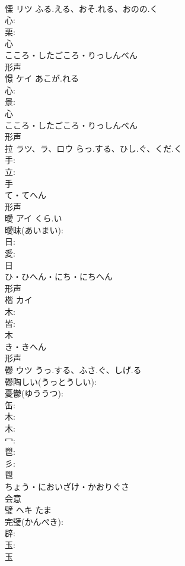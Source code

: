 \documentclass[8pt]{extreport}
\begin{document}
\begin{CJK}{UTF8}{min}
\\	慄	リツ	ふる.える、おそ.れる、おのの.く		
\\	心: 
\\	栗: 
\\	心	
\\	こころ・したごころ・りっしんべん	
\\	形声 
\\	憬	ケイ	あこが.れる		
\\	心: 
\\	景: 
\\	心	
\\	こころ・したごころ・りっしんべん	
\\	形声 
\\	拉	ラツ、ラ、ロウ	らっ.する、ひし.ぐ、くだ.く		
\\	手: 
\\	立: 
\\	手	
\\	て・てへん	
\\	形声 
\\	曖	アイ	くら.い		
\\	曖昧(あいまい): 
\\	日: 
\\	愛: 
\\	日	
\\	ひ・ひへん・にち・にちへん	
\\	形声 
\\	楷	カイ			
\\	木: 
\\	皆: 
\\	木	
\\	き・きへん	
\\	形声 
\\	鬱	ウツ	うっ.する、ふさ.ぐ、しげ.る		
\\	鬱陶しい(うっとうしい): 
\\	憂鬱(ゆううつ): 
\\	缶: 
\\	木: 
\\	木: 
\\	冖: 
\\	鬯: 
\\	彡: 
\\	鬯	
\\	ちょう・においざけ・かおりぐさ	
\\	会意 
\\	璧	ヘキ	たま		
\\	完璧(かんぺき): 
\\	辟: 
\\	玉: 
\\	玉	

\end{CJK}
\end{document}
